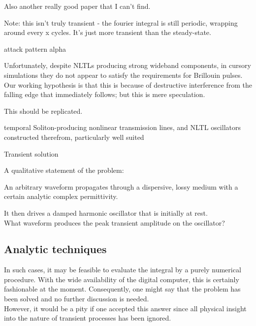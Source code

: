 \documentclass[paper.tex]{subfiles}
\begin{document}
Also another really good paper that I can't find.









Note: this isn't truly transient - the fourier integral is still periodic, wrapping around every x cycles. It's just more transient than the steady-state.




attack pattern alpha


Unfortunately, despite NLTLs producing strong wideband components, in cursory simulations they do 
not appear to satisfy the requirements for Brillouin pulses. Our working hypothesis is that this is 
because of destructive interference from the falling edge that immediately follows; but this is 
mere speculation.
\begin{autem}
	This should be replicated.
\end{autem}

temporal Soliton-producing nonlinear transmission lines, and NLTL oscillators constructed therefrom, particularly well suited 


Transient solution

\pagebreak
A qualitative statement of the problem:

\begin{toolchain}
An arbitrary waveform propagates through a dispersive, lossy medium with a certain analytic complex 
permittivity. 

It then drives a damped harmonic oscillator that is initially at rest.\\

What waveform produces the peak transient amplitude on the oscillator?
\end{toolchain}

\subsection{Analytic techniques}



\begin{fquote}
	In such cases, it may be feasible to evaluate the integral by a purely numerical procedure. With the wide availability of the digital computer, this is certainly fashionable at the moment. Consequently, one might say that the problem has been solved and no further discussion is needed. \\
	
	However, it would be a pity if one accepted this answer since all physical insight into the nature of transient processes has been ignored. 
\end{fquote}
\end{document}
